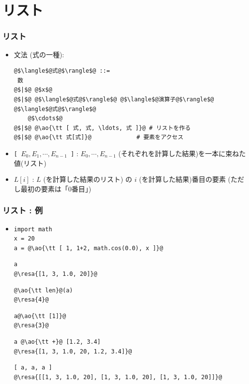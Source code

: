 \documentclass[10pt,dvipdfmx]{beamer}
\newcommand{\ore}[1]{{\color{orange}#1}}
\newcommand{\ao}[1]{{\color{blue}#1}}
\newcommand{\resa}[1]{\ore{\textsl{$\rightarrow$ #1}}}
\begin{document}
\section{リスト}

\begin{frame}[fragile]
\frametitle{リスト}
\begin{itemize}
\item 文法 (式の一種):
\begin{lstlisting}
@$\langle$@式@$\rangle$@ ::=
 数
@$|$@ @$x$@
@$|$@ @$\langle$@式@$\rangle$@ @$\langle$@演算子@$\rangle$@ @$\langle$@式@$\rangle$@
    @$\cdots$@
@$|$@ @\ao{\tt [ 式, 式, \ldots, 式 ]}@ # リストを作る
@$|$@ @\ao{\tt 式[式]}@             # 要素をアクセス
\end{lstlisting}

\item {\tt [ $E_0, E_1, \cdots, E_{n-1}$ ]} : $E_0, \cdots, E_{n-1}$ (それぞれを計算した結果)を一本に束ねた値(リスト)
\item {\tt $L[i]$} : $L$ (を計算した結果のリスト) の $i$ (を計算した結果)番目の要素 (ただし最初の要素は「0番目」)
\end{itemize}
\end{frame}

\begin{frame}[fragile]
\frametitle{リスト : 例}
\begin{itemize}
\item []
\begin{lstlisting}
import math
x = 20
a = @\ao{\tt [ 1, 1+2, math.cos(0.0), x ]}@
\end{lstlisting}
\begin{lstlisting}
a
@\resa{[1, 3, 1.0, 20]}@
\end{lstlisting}
\begin{lstlisting}
@\ao{\tt len}@(a)
@\resa{4}@
\end{lstlisting}
\begin{lstlisting}
a@\ao{\tt [1]}@
@\resa{3}@
\end{lstlisting}
\begin{lstlisting}
a @\ao{\tt +}@ [1.2, 3.4]
@\resa{[1, 3, 1.0, 20, 1.2, 3.4]}@
\end{lstlisting}
\begin{lstlisting}
[ a, a, a ]
@\resa{[[1, 3, 1.0, 20], [1, 3, 1.0, 20], [1, 3, 1.0, 20]]}@
\end{lstlisting}
\end{itemize}
\end{frame}
\end{document}
